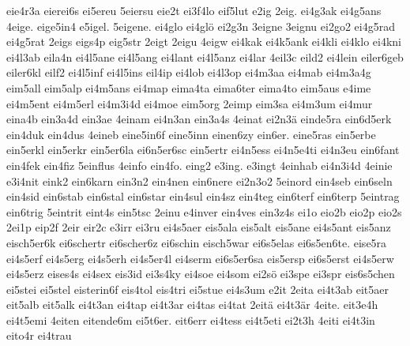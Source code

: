 {    eie4r3a
    eierei6s
    ei5ereu
    5eiersu
    eie2t
    ei3f4lo
    eif5lut
    e2ig
    2eig.
    ei4g3ak
    ei4g5ans
    4eige.
    eige5in4
    e5igel.
    5eigene.
    ei4glo
    ei4glö
    ei2g3n
    3eigne
    3eignu
    ei2go2
    ei4g5rad
    ei4g5rat
    2eigs
    eigs4p
    eig5str
    2eigt
    2eigu
    4eigw
    ei4kak
    ei4k5ank
    ei4kli
    ei4klo
    ei4kni
    ei4l3ab
    eila4n
    ei4l5ane
    ei4l5ang
    ei4lant
    ei4l5anz
    ei4lar
    4eil3c
    eild2
    ei4lein
    eiler6geb
    eiler6kl
    eilf2
    ei4l5inf
    ei4l5ins
    eil4ip
    ei4lob
    ei4l3op
    ei4m3aa
    ei4mab
    ei4m3a4g
    eim5all
    eim5alp
    ei4m5ans
    ei4map
    eima4ta
    eima6ter
    eima4to
    eim5aus
    e4ime
    ei4m5ent
    ei4m5erl
    ei4m3i4d
    ei4moe
    eim5org
    2eimp
    eim3sa
    ei4m3um
    ei4mur
    eina4b
    ein3a4d
    ein3ae
    4einam
    ei4n3an
    ein3a4s
    4einat
    ei2n3ä
    einde5ra
    ein6d5erk
    ein4duk
    ein4dus
    4eineb
    eine5in6f
    eine5inn
    einen6zy
    ein6er.
    eine5ras
    ein5erbe
    ein5erkl
    ein5erkr
    ein5er6la
    ei6n5er6sc
    ein5ertr
    ei4n5ess
    ei4n5e4ti
    ei4n3eu
    ein6fant
    ein4fek
    ein4fiz
    5einflus
    4einfo
    ein4fo.
    eing2
    e3ing.
    e3ingt
    4einhab
    ei4n3i4d
    4einie
    e3i4nit
    eink2
    ein6karn
    ein3n2
    ein4nen
    ein6nere
    ei2n3o2
    5einord
    ein4seb
    ein6seln
    ein4sid
    ein6stab
    ein6stal
    ein6star
    ein4sul
    ein4sz
    ein4teg
    ein6terf
    ein6terp
    5eintrag
    ein6trig
    5eintrit
    eint4s
    ein5tsc
    2einu
    e4inver
    ein4ves
    ein3z4s
    ei1o
    eio2b
    eio2p
    eio2s
    2ei1p
    eip2f
    2eir
    eir2c
    e3irr
    ei3ru
    ei4s5aer
    eis5ala
    eis5alt
    eis5ane
    ei4s5ant
    eis5anz
    eisch5er6k
    ei6schertr
    ei6scher6z
    ei6schin
    eisch5war
    ei6s5elas
    ei6s5en6te.
    eise5ra
    ei4s5erf
    ei4s5erg
    ei4s5erh
    ei4s5er4l
    ei4serm
    ei6s5er6sa
    eis5ersp
    ei6s5erst
    ei4s5erw
    ei4s5erz
    eises4s
    ei4sex
    eis3id
    ei3s4ky
    ei4soe
    ei4som
    ei2sö
    ei3spe
    ei3spr
    eis6s5chen
    ei5stei
    ei5stel
    eisterin6f
    eis4tol
    eis4tri
    ei5stue
    ei4s3um
    e2it
    2eita
    ei4t3ab
    eit5aer
    eit5alb
    eit5alk
    ei4t3an
    ei4tap
    ei4t3ar
    ei4tas
    ei4tat
    2eitä
    ei4t3är
    4eite.
    eit3e4h
    ei4t5emi
    4eiten
    eitende6m
    ei5t6er.
    eit6err
    ei4tess
    ei4t5eti
    ei2t3h
    4eiti
    ei4t3in
    eito4r
    ei4trau
}
